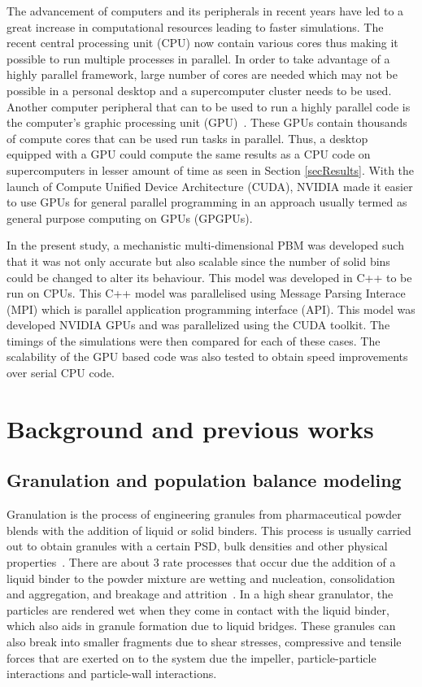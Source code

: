 \documentclass[preprint,10pt,authoryear,review]{elsarticle}
\begin{document}
\begin{linenumbers}
The advancement of computers and its peripherals in recent years have led to a great increase in 
computational resources leading to faster simulations. The recent central processing unit (CPU) 
now contain various cores thus making it possible to run multiple processes in parallel. 
In order to take advantage of a highly parallel framework, large number of cores are needed 
which may not be possible in a personal desktop and a supercomputer cluster needs to be used.
Another computer peripheral that can to be used to run a highly parallel code is the computer's 
graphic processing unit (GPU)~\citep{Prakash2013b}. These GPUs contain thousands of compute 
cores that can be used run tasks in parallel. Thus, a desktop equipped with a GPU could 
compute the same results as a CPU code on supercomputers in lesser amount of time as seen 
in Section \ref{secResults}. With the launch of Compute Unified Device Architecture (CUDA), 
NVIDIA made it easier to use GPUs for general parallel programming in an approach usually 
termed as general purpose computing on GPUs (GPGPUs).

In the present study, a mechanistic multi-dimensional PBM was developed such that it was not 
only accurate but also scalable since the number of solid bins could be changed to alter its 
behaviour. This model was developed in C++ to be run on CPUs. This C++ model was parallelised 
using Message Parsing Interace (MPI) which is parallel application programming interface (API). 
This model was developed NVIDIA GPUs and was parallelized using the CUDA toolkit. The timings of 
the simulations were then compared for each of these cases. The scalability of the GPU based code 
was also tested to obtain speed improvements over serial CPU code.


\section{Background and previous works}
\label{secBkgd}
\subsection{Granulation and population balance modeling}
Granulation is the process of engineering granules from pharmaceutical powder blends 
with the addition of liquid or solid binders. This process is usually carried out 
to obtain granules with a certain PSD,  bulk densities and other physical properties~\citep{Barrasso2015cerd}.
There are about 3 rate processes that occur due the addition of a liquid binder to the 
powder mixture are wetting and nucleation, consolidation and aggregation, and breakage 
and attrition~\citep{sen2014}. In a high shear granulator, the particles are rendered wet 
when they come in contact with the liquid binder, which also aids in granule formation due to 
liquid bridges. These granules can also break into smaller fragments due to shear stresses, 
compressive and tensile forces that are exerted on to the system due the impeller, 
particle-particle interactions and particle-wall interactions.


\end{linenumbers}
\end{document}
